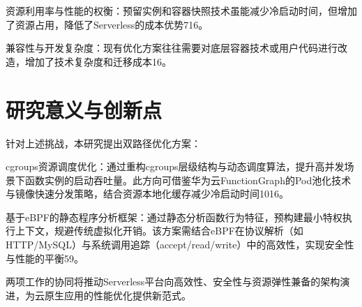 资源利用率与性能的权衡：预留实例和容器快照技术虽能减少冷启动时间，但增加了资源占用，降低了Serverless的成本优势716。

兼容性与开发复杂度：现有优化方案往往需要对底层容器技术或用户代码进行改造，增加了技术复杂度和迁移成本16。


\section{研究意义与创新点}
针对上述挑战，本研究提出双路径优化方案：

cgroups资源调度优化：通过重构cgroups层级结构与动态调度算法，提升高并发场景下函数实例的启动吞吐量。此方向可借鉴华为云FunctionGraph的Pod池化技术与镜像快速分发策略，结合资源本地化缓存减少冷启动时间1016。

基于eBPF的静态程序分析框架：通过静态分析函数行为特征，预构建最小特权执行上下文，规避传统虚拟化开销。该方案需结合eBPF在协议解析（如HTTP/MySQL）与系统调用追踪（accept/read/write）中的高效性，实现安全性与性能的平衡59。

两项工作的协同将推动Serverless平台向高效性、安全性与资源弹性兼备的架构演进，为云原生应用的性能优化提供新范式。









